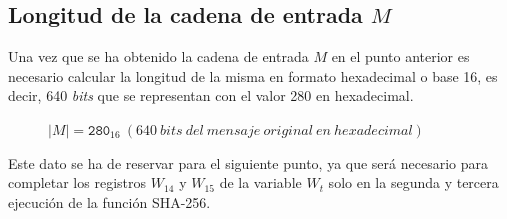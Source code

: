 \documentclass{article}
\begin{document}
    \subsection{Longitud de la cadena de entrada $M$}
        Una vez que se ha obtenido la cadena de entrada $M$ en el punto anterior es necesario calcular la longitud de la misma en formato hexadecimal o base 16, es decir, 640 \textit{bits} que se representan con el valor 280 en hexadecimal.
        \begin{figure}[H]
        \centering
            $|M| = \texttt{280}_{16}\ (640\ bits\ del\ mensaje\ original\ en\ hexadecimal)$
        \end{figure}
        Este dato se ha de reservar para el siguiente punto, ya que será necesario para completar los registros $W_{14}$ y $W_{15}$ de la variable $W_t$ solo en la segunda y tercera ejecución de la función SHA-256.
    
\end{document}
